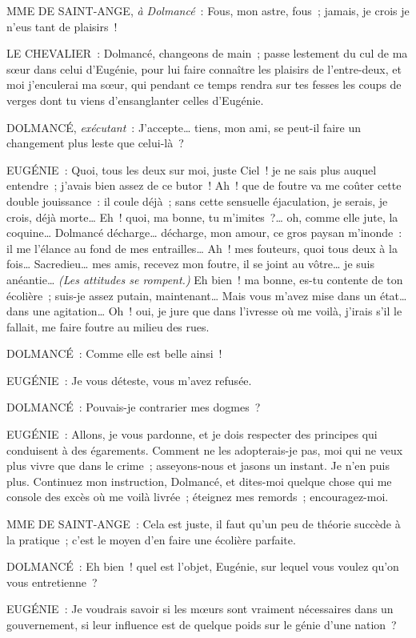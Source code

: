 \documentclass[french,twoside]{book} %
\begin{document}
MME DE SAINT-ANGE, {\itshape à Dolmancé} : Fous, mon astre, fous ; jamais, je crois je n’eus tant de plaisirs !\par
LE CHEVALIER : Dolmancé, changeons de main ; passe lestement du cul de ma sœur dans celui d’Eugénie, pour lui faire connaître les plaisirs de l’entre-deux, et moi j’enculerai ma sœur, qui pendant ce temps rendra sur tes fesses les coups de verges dont tu viens d’ensanglanter celles d’Eugénie.\par
DOLMANCÉ, {\itshape exécutant} : J’accepte… tiens, mon ami, se peut-il faire un changement plus leste que celui-là ?\par
EUGÉNIE : Quoi, tous les deux sur moi, juste Ciel ! je ne sais plus auquel entendre ; j’avais bien assez de ce butor ! Ah ! que de foutre va me coûter cette double jouissance : il coule déjà ; sans cette sensuelle éjaculation, je serais, je crois, déjà morte… Eh ! quoi, ma bonne, tu m’imites ?… oh, comme elle jute, la coquine… Dolmancé décharge… décharge, mon amour, ce gros paysan m’inonde : il me l’élance au fond de mes entrailles… Ah ! mes fouteurs, quoi tous deux à la fois… Sacredieu… mes amis, recevez mon foutre, il se joint au vôtre… je suis anéantie… {\itshape (Les attitudes se rompent.)} Eh bien ! ma bonne, es-tu contente de ton écolière ; suis-je assez putain, maintenant… Mais vous m’avez mise dans un état… dans une agitation… Oh ! oui, je jure que dans l’ivresse où me voilà, j’irais s’il le fallait, me faire foutre au milieu des rues.\par
DOLMANCÉ : Comme elle est belle ainsi !\par
EUGÉNIE : Je vous déteste, vous m’avez refusée.\par
DOLMANCÉ : Pouvais-je contrarier mes dogmes ?\par
EUGÉNIE : Allons, je vous pardonne, et je dois respecter des principes qui conduisent à des égarements. Comment ne les adopterais-je pas, moi qui ne veux plus vivre que dans le crime ; asseyons-nous et jasons un instant. Je n’en puis plus. Continuez mon instruction, Dolmancé, et dites-moi quelque chose qui me console des excès où me voilà livrée ; éteignez mes remords ; encouragez-moi.\par
MME DE SAINT-ANGE : Cela est juste, il faut qu’un peu de théorie succède à la pratique ; c’est le moyen d’en faire une écolière parfaite.\par
DOLMANCÉ : Eh bien ! quel est l’objet, Eugénie, sur lequel vous voulez qu’on vous entretienne ?\par
EUGÉNIE : Je voudrais savoir si les mœurs sont vraiment nécessaires dans un gouvernement, si leur influence est de quelque poids sur le génie d’une nation ?\par
\end{document}
